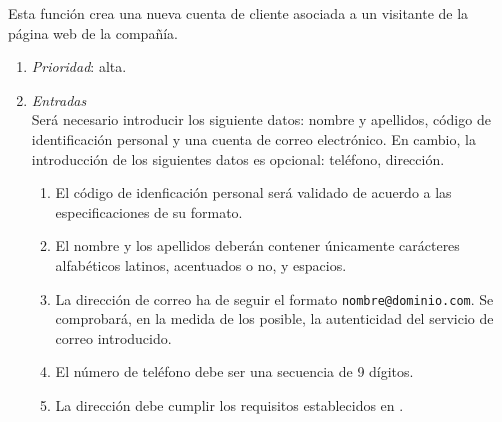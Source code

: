 

 \label{fun:registrarse}
	Esta función crea una nueva cuenta de cliente asociada a un visitante de la página web de la compañía.

	\begin{enumerate}
		\item \textit{Prioridad}: alta.
		\item \textit{Entradas}\\
			Será necesario introducir los siguiente datos: nombre y apellidos, código de identificación personal y una cuenta de correo electrónico. En cambio, la introducción de los siguientes datos es opcional: teléfono, dirección.

			\begin{enumerate}
				\item El código de idenficación personal será validado de acuerdo a las especificaciones de su formato.
				\item El nombre y los apellidos deberán contener únicamente carácteres alfabéticos latinos, acentuados o no, y espacios.
				\item La dirección de correo ha de seguir el formato \verb|nombre@dominio.com|. Se comprobará, en la medida de los posible, la autenticidad del servicio de correo introducido.
				\item El número de teléfono debe ser una secuencia de 9 dígitos. %
				\item La dirección debe cumplir los requisitos establecidos en .
			\end{enumerate}
		

\end{enumerate}
